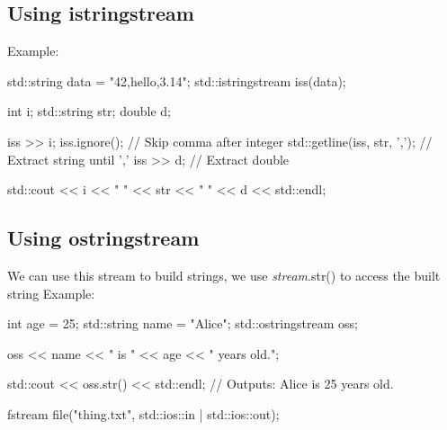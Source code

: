 \documentclass{report}
\begin{document}
     \bigbreak \noindent 
     \subsection{Using istringstream}
     \bigbreak \noindent 
     Example:
     \bigbreak \noindent 
     
     \begin{cppcode}
std::string data = "42,hello,3.14";
std::istringstream iss(data);

int i;
std::string str;
double d;

iss >> i;
iss.ignore(); // Skip comma after integer
std::getline(iss, str, ','); // Extract string until ','
iss >> d;                    // Extract double

std::cout << i << " " << str << " " << d << std::endl;
     \end{cppcode}
     

     \bigbreak \noindent 
     \subsection{Using ostringstream}
     \bigbreak \noindent 
     We can use this stream to build strings, we use \textit{stream}.str() to access the built string
     \bigbreak \noindent 
     Example:
     \bigbreak \noindent 
     
     \begin{cppcode}
int age = 25;
std::string name = "Alice";
std::ostringstream oss;

oss << name << " is " << age << " years old.";

std::cout << oss.str() << std::endl; // Outputs: Alice is 25 years old.
     \end{cppcode}
     

    \pagebreak
    \bigbreak \noindent 
    \begin{cppcode}
fstream file("thing.txt", std::ios::in | std::ios::out);
    \end{cppcode}
\end{document}
